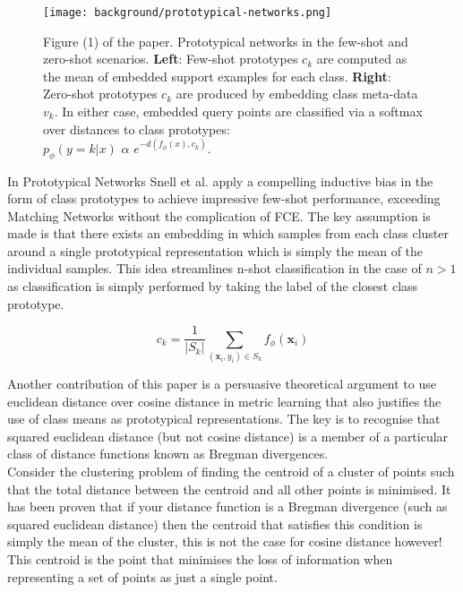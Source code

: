 \begin{figure}[H]
    \centering
    \texttt{[image: background/prototypical-networks.png]}
    \caption{Figure (1) of the paper. Prototypical networks in the few-shot and zero-shot scenarios. \textbf{Left}: Few-shot prototypes $c_k$ are computed as the mean of embedded support examples for each class. \textbf{Right}: Zero-shot
prototypes $c_k$ are produced by embedding class meta-data $v_k$. In either case, embedded query points are classified via a softmax over distances to class prototypes: \\ $p_{\phi}(y = k|x)$ $\alpha$ $e^{−d(f_{\phi}(x), c_k)}$.}
    \label{figure:background:prototypical}
\end{figure}

In Prototypical Networks \cite{protonet} Snell et al. apply a compelling inductive bias in the form of class prototypes to achieve impressive few-shot performance, exceeding Matching Networks without the complication of FCE. The key assumption is made is that there exists an embedding in which samples from each class cluster around a single prototypical representation which is simply the mean of the individual samples. This idea streamlines n-shot classification in the case of $n > 1$ as classification is simply performed by taking the label of the closest class prototype.

\begin{equation}
    c_k = \frac{1}{|S_k|} \sum_{(\mathbf{x}_i, y_i) \in S_k} f_{\phi}(\mathbf{x}_i)
\end{equation}

Another contribution of this paper is a persuasive theoretical argument to use euclidean distance over cosine distance in metric learning that also justifies the use of class means as prototypical representations. The key is to recognise that squared euclidean distance (but not cosine distance) is a member of a particular class of distance functions known as Bregman divergences. \\

Consider the clustering problem of finding the centroid of a cluster of points such that the total distance between the centroid and all other points is minimised. It has been proven that if your distance function is a Bregman divergence (such as squared euclidean distance) then the centroid that satisfies this condition is simply the mean of the cluster, this is not the case for cosine distance however! This centroid is the point that minimises the loss of information when representing a set of points as just a single point. \\

